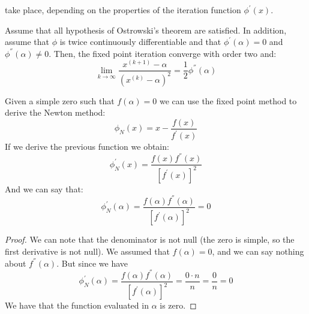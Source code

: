 \documentclass[12pt, a4paper]{report}
\begin{document}
    take place, depending on the properties of the iteration function $\phi^{'}(x)$. 
    \begin{proposition}
        Assume that all hypothesis of Ostrowski's theorem are satisfied. In addition, assume that $\phi$ is twice continuously differentiable and that $\phi^{'}(\alpha)=0$ and 
        $\phi^{''}(\alpha) \neq 0$. Then, the fixed point iteration converge with order two and:
        \[\lim_{k \rightarrow \infty}\dfrac{x^{(k+1)}-\alpha}{\left(x^{(k)}-\alpha\right)^2}=\dfrac{1}{2}\phi^{''}(\alpha)\]
    \end{proposition}
    Given a simple zero such that $f(\alpha)=0$ we can use the fixed point method to derive the Newton method: 
    \[\phi_N(x)=x-\dfrac{f(x)}{f^{'}(x)}\]
    If we derive the previous function we obtain:
    \[\phi^{'}_N(x)=\dfrac{f(x)f^{''}(x)}{\left[f^{'}(x)\right]^2}\]
    And we can say that: 
    \[\phi^{'}_N(\alpha)=\dfrac{f(\alpha)f^{''}(\alpha)}{\left[f^{'}(\alpha)\right]^2}=0\]
    \begin{proof}
        We can note that the denominator is not null (the zero is simple, so the first derivative is not null). We assumed that $f(\alpha)=0$, and we can say nothing about 
        $f^{''}(\alpha)$. But since we have 
        \[\phi^{'}_N(\alpha)=\dfrac{f(\alpha)f^{''}(\alpha)}{\left[f^{'}(\alpha)\right]^2}=\dfrac{0 \cdot n}{n}=\dfrac{0}{n}=0\]
        We have that the function evaluated in $\alpha$ is zero. 
    \end{proof}
\end{document}

